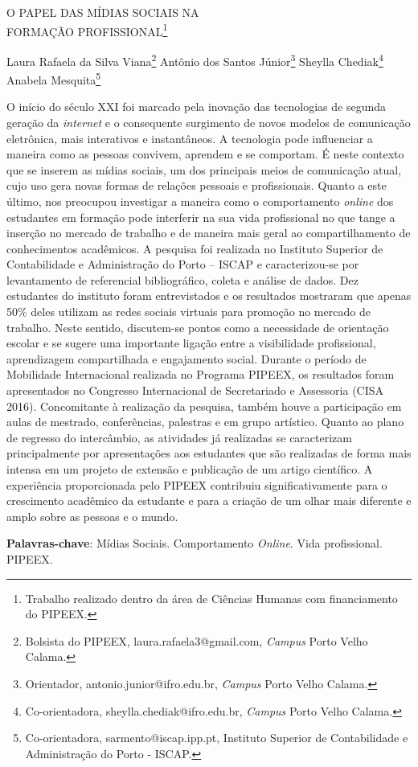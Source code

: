 \documentclass[article,12pt,onesidea,4paper,english,brazil]{abntex2}
\begin{document}
	
	
	\frenchspacing 
	
	\begin{center}
		\LARGE O PAPEL DAS MÍDIAS SOCIAIS NA\\FORMAÇÃO PROFISSIONAL\footnote{Trabalho realizado dentro da área de Ciências Humanas com financiamento do PIPEEX.}
		
		\normalsize
		Laura Rafaela da Silva Viana\footnote{Bolsista do PIPEEX, laura.rafaela3@gmail.com, \textit{Campus} Porto Velho Calama.} 
		Antônio dos Santos Júnior\footnote{Orientador, antonio.junior@ifro.edu.br, \textit{Campus} Porto Velho Calama.} 
		Sheylla Chediak\footnote{Co-orientadora, sheylla.chediak@ifro.edu.br, \textit{Campus} Porto Velho Calama.} 
		Anabela Mesquita\footnote{Co-orientadora, sarmento@iscap.ipp.pt, Instituto Superior de Contabilidade e Administração do Porto - ISCAP.} 
	\end{center}
	
	\noindent O início do século XXI foi marcado pela inovação das tecnologias de segunda
	geração da \textit{internet} e o consequente surgimento de novos modelos de comunicação
	eletrônica, mais interativos e instantâneos. A tecnologia pode influenciar a maneira
	como as pessoas convivem, aprendem e se comportam. É neste contexto que se
	inserem as mídias sociais, um dos principais meios de comunicação atual, cujo uso
	gera novas formas de relações pessoais e profissionais. Quanto a este último, nos
	preocupou investigar a maneira como o comportamento \textit{online} dos estudantes em
	formação pode interferir na sua vida profissional no que tange a inserção no
	mercado de trabalho e de maneira mais geral ao compartilhamento de
	conhecimentos acadêmicos. A pesquisa foi realizada no Instituto Superior de
	Contabilidade e Administração do Porto – ISCAP e caracterizou-se por levantamento
	de referencial bibliográfico, coleta e análise de dados. Dez estudantes do instituto
	foram entrevistados e os resultados mostraram que apenas 50\% deles utilizam as
	redes sociais virtuais para promoção no mercado de trabalho. Neste sentido,
	discutem-se pontos como a necessidade de orientação escolar e se sugere uma
	importante ligação entre a visibilidade profissional, aprendizagem compartilhada e
	engajamento social. Durante o período de Mobilidade Internacional realizada no
	Programa PIPEEX, os resultados foram apresentados no Congresso Internacional
	de Secretariado e Assessoria (CISA 2016). Concomitante à realização da pesquisa,
	também houve a participação em aulas de mestrado, conferências, palestras e em
	grupo artístico. Quanto ao plano de regresso do intercâmbio, as atividades já
	realizadas se caracterizam principalmente por apresentações aos estudantes que
	são realizadas de forma mais intensa em um projeto de extensão e publicação de
	um artigo científico. A experiência proporcionada pelo PIPEEX contribuiu
	significativamente para o crescimento acadêmico da estudante e para a criação de
	um olhar mais diferente e amplo sobre as pessoas e o mundo.
	
	\vspace{\onelineskip}
	
	\noindent
	\textbf{Palavras-chave}: Mídias Sociais. Comportamento \textit{Online}. Vida profissional. PIPEEX.
	
\end{document}
